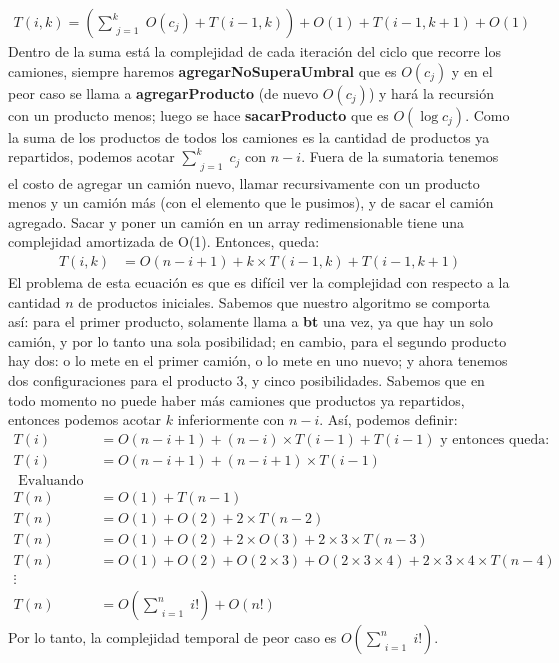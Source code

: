 \begin{align*}
T(i,k) = \left(\sum\limits_{\substack{j = 1}}^k O(c_j) + T(i-1,k)\right) + O(1) + T(i-1,k+1) + O(1)
\end{align*}
Dentro de la suma está la complejidad de cada iteración del ciclo que recorre los camiones, siempre haremos \textbf{agregarNoSuperaUmbral} que es $O(c_j)$ y en el peor caso se llama a \textbf{agregarProducto} (de nuevo $O(c_j)$) y hará la recursión con un producto menos; luego se hace \textbf{sacarProducto} que es $O(\log c_j)$. Como la suma de los productos de todos los camiones es la cantidad de productos ya repartidos, podemos acotar $\sum\limits_{\substack{j = 1}}^k c_j$ con $n-i$. Fuera de la sumatoria tenemos el costo de agregar un camión nuevo, llamar recursivamente con un producto menos y un camión más (con el elemento que le pusimos), y de sacar el camión agregado. Sacar y poner un camión en un array redimensionable tiene una complejidad amortizada de O(1). Entonces, queda:
\begin{align*}
T(i,k) &= O(n-i+1) + k \times T(i-1,k) + T(i-1,k+1)
\end{align*}
El problema de esta ecuación es que es difícil ver la complejidad con respecto a la cantidad $n$ de productos iniciales. Sabemos que nuestro algoritmo se comporta así: para el primer producto, solamente llama a \textbf{bt} una vez, ya que hay un solo camión, y por lo tanto una sola posibilidad; en cambio, para el segundo producto hay dos: o lo mete en el primer camión, o lo mete en uno nuevo; y ahora tenemos dos configuraciones para el producto 3, y cinco posibilidades. Sabemos que en todo momento no puede haber más camiones que productos ya repartidos, entonces podemos acotar $k$ inferiormente con $n-i$. Así, podemos definir:
\begin{align*}
T(i) &= O(n-i+1) + (n-i) \times T(i-1) + T(i-1) \text{ y entonces queda: } \\
T(i) &= O(n-i+1) + (n-i+1) \times T(i-1) \\
\text{ Evaluando en n: } \\
T(n) &= O(1) + T(n-1) \\
T(n) &= O(1) + O(2) + 2 \times T(n-2) \\
T(n) &= O(1) + O(2) + 2 \times O(3) + 2 \times 3 \times T(n-3) \\
T(n) &= O(1) + O(2) + O(2 \times 3) + O(2 \times 3 \times 4) + 2 \times 3 \times 4 \times T(n-4) \\
\vdots \\
T(n) &= O\left(\sum\limits_{\substack{i = 1}}^n i!\right) + O(n!)
\end{align*}
Por lo tanto, la complejidad temporal de peor caso es $O\left(\sum\limits_{\substack{i = 1}}^n i!\right)$.


